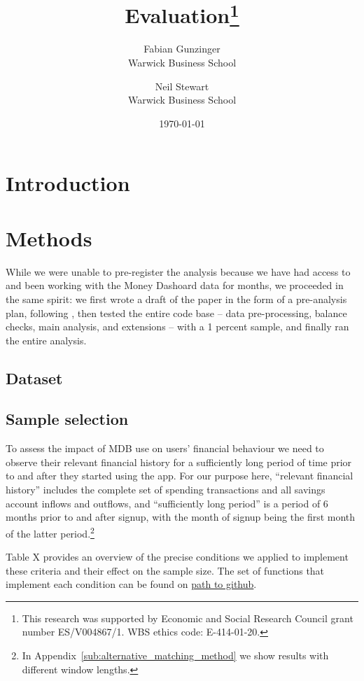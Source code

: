 \documentclass[a4paper, 11pt]{article}
\title{\textbf{Evaluation\footnote{This research was supported by Economic and Social Research Council grant number ES/V004867/1. WBS ethics code: E-414-01-20.}}}
\author{
    Fabian Gunzinger \\ Warwick Business School
    \and
    Neil Stewart \\ Warwick Business School
}
\date{\today}
\begin{document}
\maketitle
% 

\tableofcontents
\newpage

% 
\section{Introduction}%
\label{sec:introduction}


% 
\section{Methods}%
\label{sec:data}

While we were unable to pre-register the analysis because we have had access to
and been working with the Money Dashoard data for months, we proceeded in the
same spirit: we first wrote a draft of the paper in the form of a pre-analysis
plan, following \citet{olken2015promises}, then tested the entire code base --
data pre-processing, balance checks, main analysis, and extensions -- with a 1
percent sample, and finally ran the entire analysis.


\subsection{Dataset}%
\label{sub:dataset}


\subsection{Sample selection}%
\label{sub:sample_selection}

To assess the impact of MDB use on users' financial behaviour we need to
observe their relevant financial history for a sufficiently long period of time
prior to and after they started using the app. For our purpose here, ``relevant
financial history'' includes the complete set of spending transactions and all
savings account inflows and outflows, and ``sufficiently long period'' is a
period of 6 months prior to and after signup, with the month of signup being
the first month of the latter period.\footnote{In
Appendix~\ref{sub:alternative_matching_method} we show results with different
window lengths. }

Table X provides an overview of the precise conditions we applied to implement
these criteria and their effect on the sample size. The set of functions that
implement each condition can be found on \href{path-to-github}{path to github}.
\end{document}
